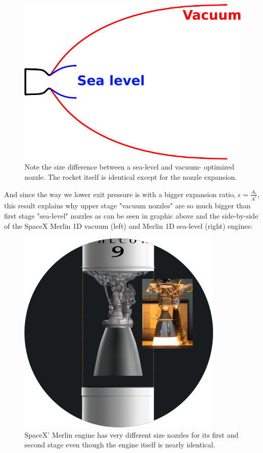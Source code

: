 \documentclass[twocolumn]{memoir} %
\begin{document}
\begin{figure}[H]
    \includegraphics[width=0.9\columnwidth]{nozzle_sl_vacuum}
    \caption{Note the size difference between a sea-level and vacuum- optimized 
    nozzle.  The rocket itself is identical except for the nozzle expansion.}
\end{figure}

And since the way we lower exit pressure is with a bigger expansion
ratio, \(\epsilon = \frac{A_e}{A^*}\), this result explains why upper
stage "vacuum nozzles" are so much bigger than first stage "sea-level"
nozzles as can be seen in graphic above and the side-by-side of the
SpaceX Merlin 1D vacuum (left) and Merlin 1D sea-level (right) engines:

\begin{figure}[H]
    \includegraphics[width=0.9\columnwidth]{merlin}
    \caption{SpaceX' Merlin engine has very different size nozzles for its first
    and second stage even though the engine itself is nearly identical.}
\end{figure}
\end{document}
